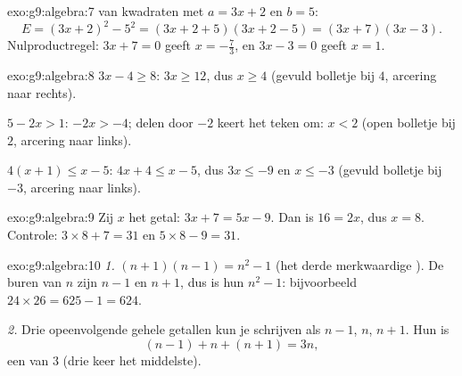 \begin{solution}{exo:g9:algebra:7}
 van kwadraten met $a = 3x + 2$ en $b = 5$:
\[
E = (3x + 2)^2 - 5^2 = (3x + 2 + 5)(3x + 2 - 5) = (3x + 7)(3x - 3).
\]
Nulproductregel: $3x + 7 = 0$ geeft $x = -\frac73$, en $3x - 3 = 0$ geeft
$x = 1$.
\end{solution}

\begin{solution}{exo:g9:algebra:8}
$3x - 4 \geq 8$: $3x \geq 12$, dus $x \geq 4$ (gevuld bolletje bij $4$, arcering
naar rechts).

$5 - 2x > 1$: $-2x > -4$; delen door $-2$ keert het teken om: $x < 2$ (open
bolletje bij $2$, arcering naar links).

$4(x+1) \leq x - 5$: $4x + 4 \leq x - 5$, dus $3x \leq -9$ en $x \leq -3$ (gevuld
bolletje bij $-3$, arcering naar links).
\end{solution}

\begin{solution}{exo:g9:algebra:9}
Zij $x$ het getal: $3x + 7 = 5x - 9$. Dan is $16 = 2x$, dus $x = 8$. Controle:
$3 \times 8 + 7 = 31$ en $5 \times 8 - 9 = 31$.
\end{solution}

\begin{solution}{exo:g9:algebra:10}
\emph{1.} $(n+1)(n-1) = n^2 - 1$ (het derde merkwaardige ). De buren van
$n$ zijn $n - 1$ en $n + 1$, dus is hun  $n^2 - 1$: bijvoorbeeld
$24 \times 26 = 625 - 1 = 624$.

\emph{2.} Drie opeenvolgende gehele getallen kun je schrijven als $n - 1$, $n$,
$n + 1$. Hun  is
\[
(n-1) + n + (n+1) = 3n ,
\]
een  van $3$ (drie keer het middelste).
\end{solution}

